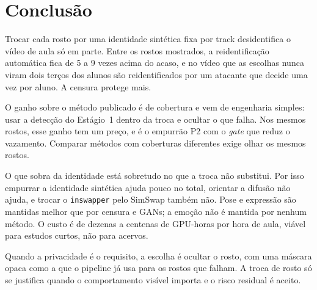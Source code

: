 \section{Conclusão}

Trocar cada rosto por uma identidade sintética fixa por track desidentifica o vídeo de aula só em parte. Entre os rostos mostrados, a reidentificação automática fica de 5 a 9 vezes acima do acaso, e no vídeo que as escolhas nunca viram dois terços dos alunos são reidentificados por um atacante que decide uma vez por aluno. A censura protege mais.

O ganho sobre o método publicado é de cobertura e vem de engenharia simples: usar a detecção do Estágio~1 dentro da troca e ocultar o que falha. Nos mesmos rostos, esse ganho tem um preço, e é o empurrão P2 com o \emph{gate} que reduz o vazamento. Comparar métodos com coberturas diferentes exige olhar os mesmos rostos.

O que sobra da identidade está sobretudo no que a troca não substitui. Por isso empurrar a identidade sintética ajuda pouco no total, orientar a difusão não ajuda, e trocar o \texttt{inswapper} pelo SimSwap também não. Pose e expressão são mantidas melhor que por censura e GANs; a emoção não é mantida por nenhum método. O custo é de dezenas a centenas de GPU-horas por hora de aula, viável para estudos curtos, não para acervos.

Quando a privacidade é o requisito, a escolha é ocultar o rosto, com uma máscara opaca como a que o pipeline já usa para os rostos que falham. A troca de rosto só se justifica quando o comportamento visível importa e o risco residual é aceito.
